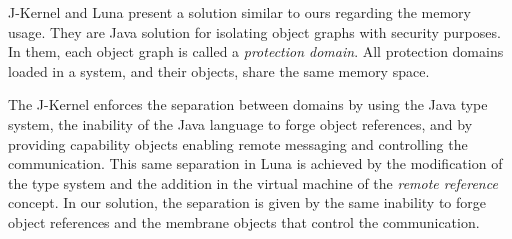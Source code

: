 J-Kernel \cite{Hawb98a} and Luna \cite{Hawb02a} present a solution similar to ours regarding the memory usage. They are Java solution for isolating object graphs with security purposes. In them, each object graph is called a \emph{protection domain}. All protection domains loaded in a system, and their objects, share the same memory space. 

The J-Kernel enforces the separation between domains by using the Java type system, the inability of the Java language to forge object references, and by providing capability objects\cite{Levy84a,Mill03a,Spoo00a} enabling remote messaging and controlling the communication. This same separation in Luna \cite{Hawb02a} is achieved by the modification of the type system and the addition in the virtual machine of the \emph{remote reference} concept. In our solution, the separation is given by the same inability to forge object references and the membrane objects that control the communication.

